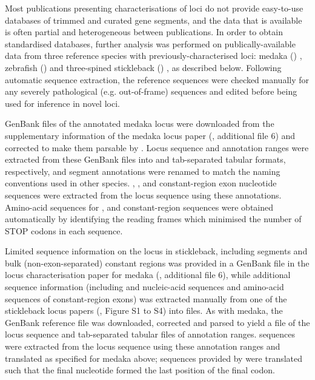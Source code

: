 Most publications presenting characterisations of \igh{} loci do not provide easy-to-use databases of trimmed and curated gene segments, and the data that is available is often partial and heterogeneous between publications. In order to obtain standardised databases, further analysis was performed on publically-available data from three reference species with previously-characterised \igh{} loci: medaka () \parencite{magadan2011medaka}, zebrafish () \parencite{danilova2005zebrafish} and three-spined stickleback () \parencite{bao2010stickleback,gambondeza2011stickleback}, as described below. Following automatic sequence extraction, the reference sequences were checked manually for any severely pathological (e.g. out-of-frame) sequences and edited before being used for inference in novel loci.


GenBank files of the annotated medaka \igh{} locus were downloaded from the supplementary information of the medaka locus paper (\parencite{magadan2011medaka}, additional file 6) and corrected to make them parsable by . Locus sequence and annotation ranges were extracted from these GenBank files into  and tab-separated tabular formats, respectively, and segment annotations were renamed to match the naming conventions used in other species. \vh, \dh, \jh and constant-region exon nucleotide sequences were extracted from the locus sequence using these annotations. Amino-acid sequences for \vh, \jh and constant-region sequences were obtained automatically by identifying the reading frames which minimised the number of STOP codons in each sequence.


Limited sequence information on the \igh{} locus in stickleback, including \vh segments and bulk (non-exon-separated) constant regions was provided in a GenBank file in the locus characterisation paper for medaka (\parencite{magadan2011medaka}, additional file 6), while additional sequence information (including \dh and \jh nucleic-acid sequences and amino-acid sequences of constant-region exons) was extracted manually from one of the stickleback locus papers (\parencite{bao2010stickleback},  Figure S1 to S4) into  files. As with medaka, the GenBank reference file was downloaded, corrected and parsed to yield a  file of the locus sequence and tab-separated tabular files of annotation ranges. \vh sequences were extracted from the locus sequence using these annotation ranges and translated as specified for medaka above; \jh sequences provided by \parencite{bao2010stickleback} were translated such that the final nucleotide formed the last position of the final codon.

